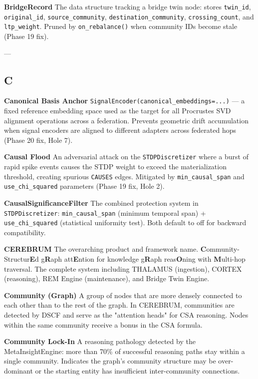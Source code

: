 \documentclass[11pt,article,oneside]{memoir}
\begin{document}
\textbf{BridgeRecord}
The data structure tracking a bridge twin node: stores \texttt{twin\_id}, \texttt{original\_id}, \texttt{source\_community}, \texttt{destination\_community}, \texttt{crossing\_count}, and \texttt{ltp\_weight}. Pruned by \texttt{on\_rebalance()} when community IDs become stale (Phase 19 fix).

---

\subsection{C}

\textbf{Canonical Basis Anchor}
\texttt{SignalEncoder(canonical\_embeddings={...})} — a fixed reference embedding space used as the target for all Procrustes SVD alignment operations across a federation. Prevents geometric drift accum\-ulation when signal encoders are aligned to different adapters across federated hops (Phase 20 fix, Hole 7).

\textbf{Causal Flood}
An adversarial attack on the \texttt{STDPDiscretizer} where a burst of rapid spike events causes the STDP weight to exceed the mater\-ialization threshold, creating spurious \texttt{CAUSES} edges. Mitigated by \texttt{min\_causal\_span} and \texttt{use\_chi\_squared} parameters (Phase 19 fix, Hole 2).

\textbf{CausalSignif\-icanceFilter}
The combined protection system in \texttt{STDPDiscretizer}: \texttt{min\_causal\_span} (minimum temporal span) + \texttt{use\_chi\_squared} (statistical uniformity test). Both default to off for backward compa\-tibility.

\textbf{CEREBRUM}
The overarching product and framework name. \textbf{C}ommunity-Structur\textbf{E}d g\textbf{R}aph att\textbf{E}ntion for knowledge g\textbf{R}aph reas\textbf{O}ning with \textbf{M}ulti-hop traversal. The complete system including THALAMUS (ingestion), CORTEX (reasoning), REM Engine (maintenance), and Bridge Twin Engine.

\textbf{Community (Graph)}
A group of nodes that are more densely connected to each other than to the rest of the graph. In CEREBRUM, communities are detected by DSCF and serve as the "attention heads" for CSA reasoning. Nodes within the same community receive a bonus in the CSA formula.

\textbf{Community Lock-In}
A reasoning pathology detected by the MetaInsightEngine: more than 70\% of successful reasoning paths stay within a single community. Indicates the graph's community structure may be over-dominant or the starting entity has insuf\-ficient inter-community connections.
\end{document}
